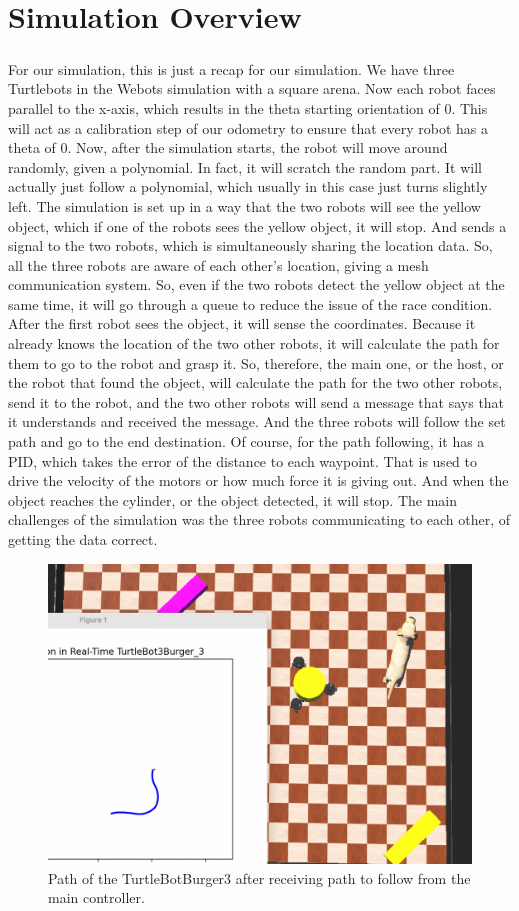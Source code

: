 \chapter{Simulation Overview}
\paragraph*{}
For our simulation, this is just a recap for our simulation. We have three Turtlebots in the Webots simulation with a square arena. Now each robot faces parallel to the x-axis, which results in the theta starting orientation of 0. This will act as a calibration step of our odometry to ensure that every robot has a theta of 0. Now, after the simulation starts, the robot will move around randomly, given a polynomial. In fact, it will scratch the random part. It will actually just follow a polynomial, which usually in this case just turns slightly left. The simulation is set up in a way that the two robots will see the yellow object, which if one of the robots sees the yellow object, it will stop. And sends a signal to the two robots, which is simultaneously sharing the location data. So, all the three robots are aware of each other's location, giving a mesh communication system. So, even if the two robots detect the yellow object at the same time, it will go through a queue to reduce the issue of the race condition. After the first robot sees the object, it will sense the coordinates. Because it already knows the location of the two other robots, it will calculate the path for them to go to the robot and grasp it. So, therefore, the main one, or the host, or the robot that found the object, will calculate the path for the two other robots, send it to the robot, and the two other robots will send a message that says that it understands and received the message. And the three robots will follow the set path and go to the end destination. Of course, for the path following, it has a PID, which takes the error of the distance to each waypoint. That is used to drive the velocity of the motors or how much force it is giving out. And when the object reaches the cylinder, or the object detected, it will stop. The main challenges of the simulation was the three robots communicating to each other, of getting the data correct.

\begin{figure}
    \centering
    \includegraphics[width=0.5\linewidth]{assets/images/simulation_overview/sim_1.png}
    \caption{Path of the TurtleBotBurger3 after receiving path to follow from the main controller.}
    \label{fig:simulation_overview1} 
\end{figure}

